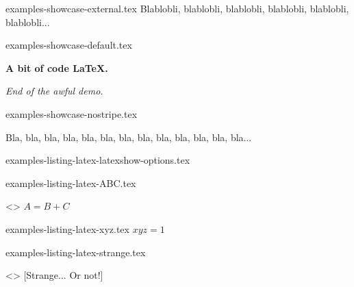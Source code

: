 \begin{filecontents*}[overwrite]{examples-showcase-external.tex}
Blablobli, blablobli, blablobli, blablobli, blablobli, blablobli...
\end{filecontents*}


\begin{filecontents*}[overwrite]{examples-showcase-default.tex}
\begin{tdocshowcase}
    \bfseries A bit of code \LaTeX.

    \bigskip

    \emph{\large End of the awful demo.}
\end{tdocshowcase}
\end{filecontents*}


\begin{filecontents*}[overwrite]{examples-showcase-nostripe.tex}
\begin{tdocshowcase}[nostripe]
    Bla, bla, bla, bla, bla, bla, bla, bla, bla, bla, bla, bla, bla...
\end{tdocshowcase}
\end{filecontents*}


\begin{filecontents*}[overwrite]{examples-listing-latex-latexshow-options.tex}
\end{filecontents*}


\begin{filecontents*}[overwrite]{examples-listing-latex-ABC.tex}
\begin{tdoclatex}<>
    $A = B + C$
\end{tdoclatex}
\end{filecontents*}


\begin{filecontents*}[overwrite]{examples-listing-latex-xyz.tex}
$x y z = 1$
\end{filecontents*}


\begin{filecontents*}[overwrite]{examples-listing-latex-strange.tex}
\begin{tdoclatex}<>
    [Strange... Or not!]
\end{tdoclatex}
\end{filecontents*}


